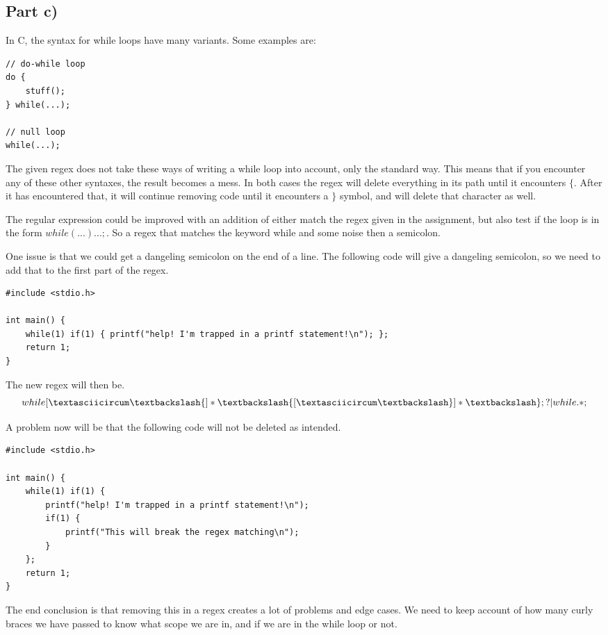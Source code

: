 \documentclass[paper=a4, fontsize=11pt]{scrartcl} %
\numberwithin{equation}{section} %
\numberwithin{figure}{section} %
\numberwithin{table}{section} %
\begin{document}
\subsection{Part c)}
In C, the syntax for while loops have many variants. Some examples are:
\begin{lstlisting}
// do-while loop
do {
    stuff();
} while(...);

// null loop
while(...);
\end{lstlisting}

The given regex does not take these ways of writing a while loop into account, only the standard way. This means that if you encounter any of these other syntaxes, the result becomes a mess. In both cases the regex will delete everything in its path until it encounters $\{$. After it has encountered that, it will continue removing code until it encounters a $\}$ symbol, and will delete that character as well.

The regular expression could be improved with an addition of either match the regex given in the assignment, but also test if the loop is in the form $while(...) ... ;$. So a regex that matches the keyword while and some noise then a semicolon.

One issue is that we could get a dangeling semicolon on the end of a line. The following code will give a dangeling semicolon, so we need to add that to the first part of the regex.

\begin{lstlisting}
#include <stdio.h>

int main() {
    while(1) if(1) { printf("help! I'm trapped in a printf statement!\n"); };
    return 1;
}
\end{lstlisting}

The new regex will then be.
$$while[\textasciicircum\textbackslash\{]*\textbackslash\{[\textasciicircum\textbackslash\}]*\textbackslash\};?|while.*;$$

A problem now will be that the following code will not be deleted as intended.
\begin{lstlisting}
#include <stdio.h>

int main() {
    while(1) if(1) {
        printf("help! I'm trapped in a printf statement!\n");
        if(1) {
            printf("This will break the regex matching\n");
        }
    };
    return 1;
}
\end{lstlisting}

The end conclusion is that removing this in a regex creates a lot of problems and edge cases. We need to keep account of how many curly braces we have passed to know what scope we are in, and if we are in the while loop or not.
\end{document}
